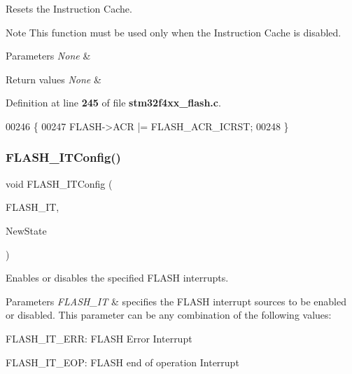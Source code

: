 Resets the Instruction Cache. 

\begin{DoxyNote}{Note}
This function must be used only when the Instruction Cache is disabled. 
\end{DoxyNote}

\begin{DoxyParams}{Parameters}
{\em None} & \\
\hline
\end{DoxyParams}

\begin{DoxyRetVals}{Return values}
{\em None} & \\
\hline
\end{DoxyRetVals}


Definition at line \textbf{ 245} of file \textbf{ stm32f4xx\+\_\+flash.\+c}.


\begin{DoxyCode}
00246 \{
00247   FLASH->ACR |= FLASH_ACR_ICRST;
00248 \}
\end{DoxyCode}
\mbox{\label{group__FLASH_ga94c1e51a9c3bf8d48eb6eb4a4d054861}} 
\subsubsection{F\+L\+A\+S\+H\+\_\+\+I\+T\+Config()}
{\footnotesize\ttfamily void F\+L\+A\+S\+H\+\_\+\+I\+T\+Config (\begin{DoxyParamCaption}\item[{uint32\+\_\+t}]{F\+L\+A\+S\+H\+\_\+\+IT,  }\item[{\textbf{ Functional\+State}}]{New\+State }\end{DoxyParamCaption})}



Enables or disables the specified F\+L\+A\+SH interrupts. 


\begin{DoxyParams}{Parameters}
{\em F\+L\+A\+S\+H\+\_\+\+IT} & specifies the F\+L\+A\+SH interrupt sources to be enabled or disabled. This parameter can be any combination of the following values\+: \begin{DoxyItemize}
\item F\+L\+A\+S\+H\+\_\+\+I\+T\+\_\+\+E\+RR\+: F\+L\+A\+SH Error Interrupt \item F\+L\+A\+S\+H\+\_\+\+I\+T\+\_\+\+E\+OP\+: F\+L\+A\+SH end of operation Interrupt \end{DoxyItemize}
\\
\hline
\end{DoxyParams}

